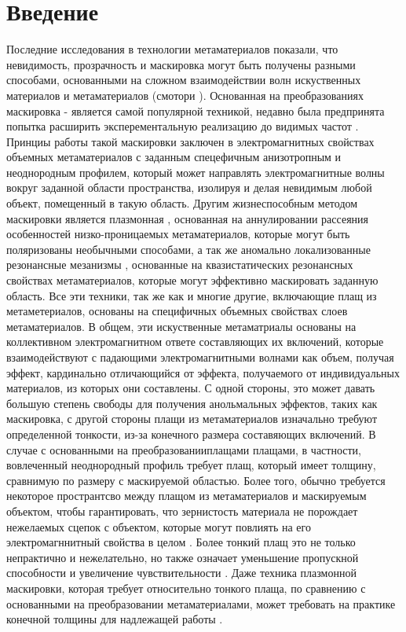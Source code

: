 \documentclass[12pt,a4paper]{article}
\begin{document}
\section{Введение}
Последние исследования в технологии метаматериалов показали, что невидимость,
прозрачность и маскировка могут быть получены разными способами, основанными на
сложном взаимодействии волн искуственных материалов и метаматериалов (смотори 
\cite{1,2}). Основанная на преобразованиях маскировка \cite{3}-\cite{6} является
самой популярной техникой, недавно была предпринята попытка расширить 
эксперементальную реализацию до видимых частот \cite{7}. Принциы работы такой 
маскировки заключен в электромагнитных свойствах объемных метаматериалов с заданным
спецефичным анизотропным и неоднородным профилем, который может направлять 
электромагнитные волны вокруг заданной области пространства, изолируя и делая
невидимым любой объект, помещенный в такую область. Другим жизнеспособным методом
маскировки является плазмонная \cite{8,9}, основанная на аннулировании рассеяния 
особенностей низко-проницаемых метаматериалов, которые могут быть поляризованы 
необычными способами, а так же аномально локализованные резонансные мезанизмы 
\cite{10}, основанные на квазистатических резонансных свойствах метаматериалов, 
которые могут эффективно маскировать заданную область. Все эти техники, так же как
и многие другие, включающие плащ из метаметериалов, основаны на специфичных объемных 
свойствах слоев метаматериалов.
В общем, эти искуственные метаматриалы основаны на коллективном электромагнитном
ответе составляющих их включений, которые взаимодействуют с падающими 
электромагнитными волнами как объем, получая эффект, кардинально отличающийся от
эффекта, получаемого от индивидуальных материалов, из которых они составлены.
С одной стороны, это может давать большую степень свободы для получения анольмальных
эффектов, таких как маскировка, с другой стороны плащи из метаматериалов изначально 
требуют определенной тонкости, из-за конечного размера составяющих включений. 
В случае с основанными на преобразованииплащами плащами, в частности, вовлеченный 
неоднородный профиль требует плащ, который имеет толщину, сравнимую по размеру с 
маскируемой областью. Более того, обычно требуется некоторое пространтсво между
плащом из метаматериалов и маскируемым объектом, чтобы гарантировать, что 
зернистость материала не порождает нежелаемых сцепок с объектом, которые могут 
повлиять на его электромагннитный свойства в целом \cite{11}. Более тонкий плащ
это не только непрактично и нежелательно, но также означает уменьшение пропускной
способности и увеличение чувствительности \cite{12}. Даже техника плазмонной 
маскировки, которая требует относительно тонкого плаща, по сравнению с основанными
на преобразовании метаматериалами, может требовать на практике конечной толщины
для 	надлежащей работы \cite{11,13}.
\end{document}
